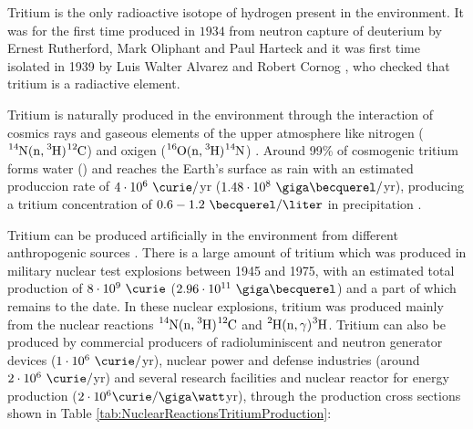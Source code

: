 Tritium is the only radioactive isotope of hydrogen present in the environment. It was for the first time produced in $1934$ from neutron capture of deuterium by Ernest Rutherford, Mark Oliphant and Paul Harteck \cite{TritiumDiscovery} and it was first time isolated in 1939 by Luis Walter Alvarez and Robert Cornog \cite{TritiumIsolate}, who checked that tritium is a radiactive element. 

Tritium is naturally produced in the environment through the interaction of cosmics rays and gaseous elements of the upper atmosphere like nitrogen ($\ce{^{14}N}(\ce{n},\ce{^{3}H})\ce{^{12}C}$) \cite{TritiumHandling} and oxigen ($\ce{^{16}O}(\ce{n},\ce{^{3}H})\ce{^{14}N}$) \cite{OxigenTritium}. Around 99\% of cosmogenic tritium forms water () and reaches the Earth's surface as rain with an estimated produccion rate of $4\cdot 10^6 ~\curie/$yr ($1.48 \cdot 10^8 ~\giga\becquerel/$yr), producing a tritium concentration of $0.6-1.2~\becquerel/\liter$ in precipitation \cite{CommonEmissionTritium, TritiumHandling}. 

Tritium can be produced artificially in the environment from different anthropogenic sources \cite{CommonEmissionTritium, TritiumHandling}. There is a large amount of tritium which was produced in military nuclear test explosions between 1945 and 1975, with an estimated total production of $8 \cdot 10^9~\curie$ ($2.96 \cdot 10^{11}~\giga\becquerel$) and a part of which remains to the date. In these nuclear explosions, tritium was produced mainly from the nuclear reactions $\ce{^{14}N}(\ce{n},\ce{^{3}H})\ce{^{12}C}$ and $\ce{^{2}H}(\ce{n},\gamma)\ce{^{3}H}$. Tritium can also be  produced by commercial producers of radioluminiscent and neutron generator devices ($1 \cdot 10^6~\curie/$yr), nuclear power and defense industries (around $2 \cdot 10^6~\curie/$yr) and several research facilities and nuclear reactor for energy production ($2 \cdot 10^6 \curie/\giga\watt$yr), through the production cross sections shown in Table \ref{tab:NuclearReactionsTritiumProduction}: 

